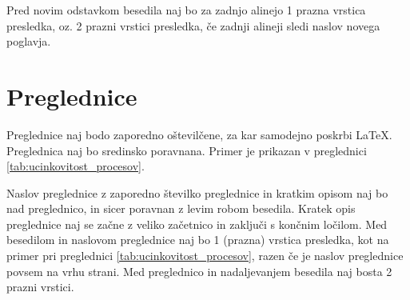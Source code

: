 Pred novim odstavkom besedila naj bo za zadnjo alinejo 1 prazna vrstica presledka, oz. 2 prazni vrstici presledka, če zadnji alineji sledi naslov novega poglavja.

\section{Preglednice}\label{sec:preglednice}

Preglednice naj bodo zaporedno oštevilčene, za kar samodejno poskrbi \LaTeX. Preglednica naj bo sredinsko poravnana. Primer je prikazan v preglednici \ref{tab:ucinkovitost_procesov}.

Naslov preglednice z zaporedno številko preglednice in kratkim opisom naj bo nad preglednico, in sicer poravnan z levim robom besedila. Kratek opis preglednice naj se začne z veliko začetnico in zaključi s končnim ločilom. Med besedilom in naslovom preglednice naj bo 1 (prazna) vrstica presledka, kot na primer pri preglednici \ref{tab:ucinkovitost_procesov}, razen če je naslov preglednice povsem na vrhu strani. Med preglednico in nadaljevanjem besedila naj bosta 2 prazni vrstici.

